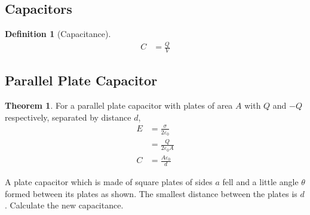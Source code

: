 \documentclass[fleqn, a4paper, 8pt, twoside]{amsart}
\theoremstyle{definition}
\newtheorem{definition}{Definition}
\theoremstyle{theorem}
\newtheorem{theorem}{Theorem}
\begin{document}
\begin{multicols}{2}
\begin{spacing}{0.6}
\section{Capacitors}

\begin{definition}[Capacitance]
	\begin{align*}
		C &= \frac{Q}{V}
	\end{align*}
\end{definition}

\subsection{Parallel Plate Capacitor}

\begin{theorem}
	For a parallel plate capacitor with plates of area $A$ with $Q$ and $-Q$ respectively, separated by distance $d$,
	\begin{align*}
		E &= \frac{\sigma}{2 \varepsilon_0}\\
		&= \frac{Q}{2 \varepsilon_0 A}\\
		C &= \frac{A \varepsilon_0}{d}
	\end{align*}
\end{theorem}

\begin{question}
	A plate capacitor which is made of square plates of sides $a$ fell and a little angle $\theta$ formed between its plates as shown.
	The smallest distance between the plates is $d$.
	Calculate the new capacitance.
\end{question}


\end{spacing}
\end{multicols}
\end{document}
